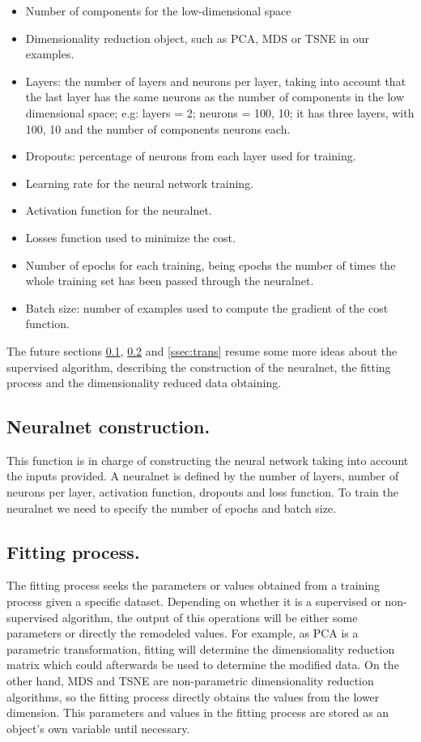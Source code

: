 \documentclass[a4paper,11pt,spanish]{report}
\begin{document}
\begin{itemize}
\item Number of components for the low-dimensional space
\item Dimensionality reduction object, such as PCA, MDS or TSNE in our examples.
\item Layers: the number of layers and neurons per layer, taking into account that the last layer has the same neurons as the number of components in the low dimensional space; e.g: layers = 2; neurons = 100, 10; it has three layers, with 100, 10 and the number of components neurons each.
\item Dropouts: percentage of neurons from each layer used for training.
\item Learning rate for the neural network training.
\item Activation function for the neuralnet.
\item Losses function used to minimize the cost.
\item Number of epochs for each training, being epochs the number of times the whole training set has been passed through the neuralnet.
\item Batch size: number of examples used to compute the gradient of the cost function.
\end{itemize}

The future sections \ref{ssec:nnc}, \ref{ssec:fit} and \ref{ssec:trans} resume some more ideas about the supervised algorithm, describing the construction of the neuralnet, the fitting process and the dimensionality reduced data obtaining.

\subsection{Neuralnet construction.}
\label{ssec:nnc}

This function is in charge of constructing the neural network taking into account the inputs provided. A neuralnet is defined by the number of layers, number of neurons per layer, activation function, dropouts and loss function. To train the neuralnet we need to specify the number of epochs and batch size.

\subsection{Fitting process.}
\label{ssec:fit}

The fitting process seeks the parameters or values obtained from a training process given a specific dataset. Depending on whether it is a supervised or non-supervised algorithm, the output of this operations will be either some parameters or directly the remodeled values. For example, as PCA is a parametric transformation, fitting will determine the dimensionality reduction matrix which could afterwards be used to determine the modified data. On the other hand, MDS and TSNE are non-parametric dimensionality reduction algorithms, so the fitting process directly obtains the values from the lower dimension. This parameters and values in the fitting process are stored as an object's own variable until necessary.
\end{document}
